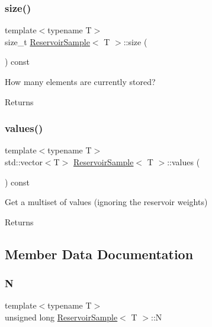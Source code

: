 \subsubsection{\texorpdfstring{size()}{size()}}
{\footnotesize\ttfamily template$<$typename T$>$ \\
size\+\_\+t \hyperlink{class_reservoir_sample}{Reservoir\+Sample}$<$ T $>$\+::size (\begin{DoxyParamCaption}{ }\end{DoxyParamCaption}) const\hspace{0.3cm}{\ttfamily [inline]}}

How many elements are currently stored? \begin{DoxyReturn}{Returns}

\end{DoxyReturn}
\mbox{\label{class_reservoir_sample_a0f0abf510882715b487f2254b6af25b1}} 
\subsubsection{\texorpdfstring{values()}{values()}}
{\footnotesize\ttfamily template$<$typename T$>$ \\
std\+::vector$<$T$>$ \hyperlink{class_reservoir_sample}{Reservoir\+Sample}$<$ T $>$\+::values (\begin{DoxyParamCaption}{ }\end{DoxyParamCaption}) const\hspace{0.3cm}{\ttfamily [inline]}}



Get a multiset of values (ignoring the reservoir weights) 

\begin{DoxyReturn}{Returns}

\end{DoxyReturn}


\subsection{Member Data Documentation}
\mbox{\label{class_reservoir_sample_a33f6cc3a51f9591f6e25dacf0cf8e663}} 
\subsubsection{\texorpdfstring{N}{N}}
{\footnotesize\ttfamily template$<$typename T$>$ \\
unsigned long \hyperlink{class_reservoir_sample}{Reservoir\+Sample}$<$ T $>$\+::N}

